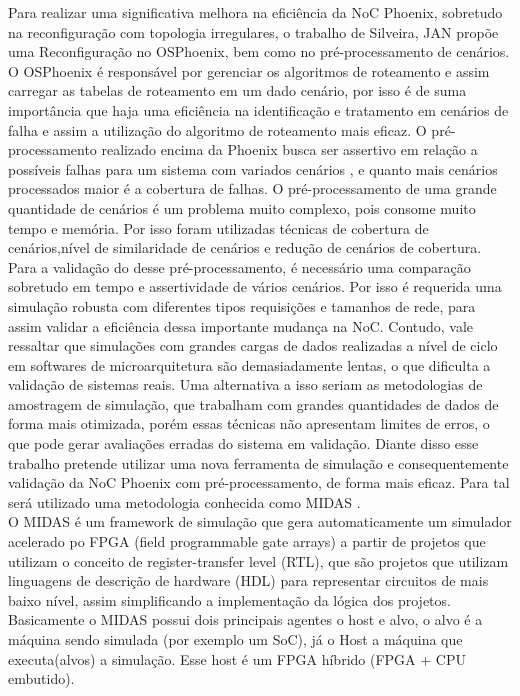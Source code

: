 \documentclass[conference]{IEEEtran}
\begin{document}
	Para realizar uma significativa melhora na eficiência da NoC Phoenix, sobretudo na reconfiguração com topologia irregulares, o trabalho de Silveira, JAN \cite{b5} propõe uma Reconfiguração no OSPhoenix, bem como no pré-processamento de cenários. O OSPhoenix é responsável por gerenciar os algoritmos de roteamento e assim carregar as tabelas de roteamento em um dado cenário, por isso é de suma importância que haja uma eficiência na identificação e tratamento em cenários de falha e assim a utilização do algoritmo de roteamento mais eficaz.
	O pré-processamento realizado encima da Phoenix busca ser assertivo em relação a possíveis falhas para um sistema com variados cenários , e quanto mais cenários processados maior é a cobertura de falhas. O pré-processamento de uma grande quantidade de cenários é um problema muito complexo, pois consome muito tempo e memória. Por isso foram utilizadas técnicas de cobertura de cenários,nível de similaridade de cenários e redução de cenários de cobertura. \\
	Para a validação do desse pré-processamento, é necessário uma comparação sobretudo em tempo e assertividade de vários cenários. Por isso é requerida uma simulação robusta com diferentes tipos requisições
	e tamanhos de rede, para assim validar a eficiência dessa importante mudança na NoC. Contudo, vale ressaltar que simulações com grandes cargas de dados realizadas a nível de ciclo em softwares de microarquitetura são demasiadamente lentas, o que dificulta a validação de sistemas reais. Uma alternativa a isso seriam as metodologias de amostragem de simulação, que trabalham com grandes quantidades de dados de forma mais otimizada, porém essas técnicas não apresentam limites de erros, o que pode gerar avaliações erradas do sistema em validação\cite{b9}. Diante disso esse trabalho pretende utilizar uma nova ferramenta de simulação e consequentemente validação da NoC Phoenix com pré-processamento, de forma mais eficaz. Para tal será utilizado uma metodologia conhecida como MIDAS \cite{b8}.\\
	O MIDAS é um framework de simulação que gera automaticamente um simulador acelerado po FPGA (field programmable gate arrays) a partir de projetos que utilizam o conceito de register-transfer level (RTL), que são projetos que utilizam linguagens de descrição de hardware (HDL) para representar circuitos de mais baixo nível, assim simplificando a implementação da lógica dos projetos. Basicamente o MIDAS possui dois principais agentes o host e alvo, o alvo é a máquina sendo simulada (por exemplo um SoC), já o Host a máquina que executa(alvos) a simulação. Esse host é um FPGA híbrido (FPGA + CPU embutido).\\
\end{document}
